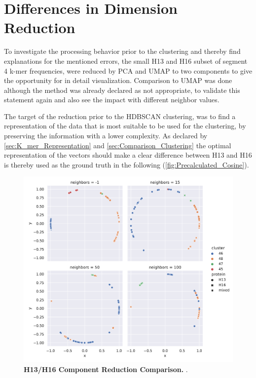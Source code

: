 \section{Differences in Dimension Reduction} \label{sec:Dimension_Reduction}

To investigate the processing behavior prior to the clustering and thereby find explanations for the mentioned errors, the small H13 and H16 subset of segment 4 k-mer frequencies, were reduced by \gls{PCA} and \gls{UMAP} to two components to give the opportunity for in detail visualization. Comparison to \gls{UMAP} was done although the method was already declared as not appropriate, to validate this statement again and also see the impact with different neighbor values. 

The target of the reduction prior to the \gls{HDBSCAN} clustering, was to find a representation of the data that is most suitable to be used for the clustering, by preserving the information with a lower complexity. As declared by \autoref{sec:K_mer_Representation} and \autoref{sec:Comparison_Clustering} the optimal representation of the vectors should make a clear difference between H13 and H16 is thereby used as the ground truth in the following (\autoref{fig:Precalculated_Cosine}).

\begin{figure}[!hbt]
    \centering
    \includegraphics[width=\textwidth]{PCA/Difference_Segment_4_H_metric_cosine.pdf}
    \caption[H13/H16 Component Reduction Comparison]{\textbf{H13/H16 Component Reduction Comparison.} .}
    \label{fig:Reduction_Comparison}
\end{figure}

